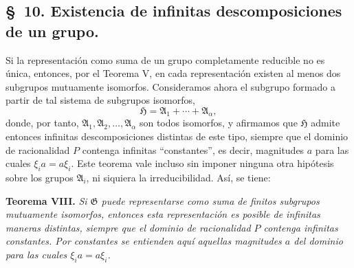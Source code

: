 
\setcounter{footnote}{19}
\subsection*{\S~10. Existencia de infinitas descomposiciones de un grupo.}

Si la representación como suma de un grupo completamente reducible no es única, entonces, por el Teorema V, en cada representación existen al menos dos subgrupos mutuamente isomorfos. Consideramos ahora el subgrupo formado a partir de tal sistema de subgrupos isomorfos,
\[
  \mathfrak H=\mathfrak A_1+\cdots+\mathfrak A_\alpha,
\]
donde, por tanto, $\mathfrak A_1,\mathfrak A_2,\ldots,\mathfrak A_\alpha$ son todos isomorfos, y afirmamos que $\mathfrak H$ admite entonces infinitas descomposiciones distintas de este tipo, siempre que el dominio de racionalidad $P$ contenga infinitas ``constantes'', es decir, magnitudes $a$ para las cuales $\xi_i a=a\xi_i$. Este teorema vale incluso sin imponer ninguna otra hipótesis sobre los grupos $\mathfrak A_i$, ni siquiera la irreducibilidad. Así, se tiene:

\textbf{Teorema VIII.} \emph{Si $\mathfrak G$ puede representarse como suma de finitos subgrupos mutuamente isomorfos, entonces esta representación es posible de infinitas maneras distintas, siempre que el dominio de racionalidad $P$ contenga infinitas constantes. Por constantes se entienden aquí aquellas magnitudes $a$ del dominio para las cuales $\xi_i a=a\xi_i$.}

